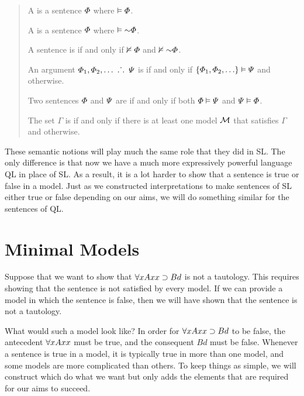 \begin{quote}
A  is a sentence $\varPhi$ where $\vDash\varPhi$.

A  is a sentence $\varPhi$ where $\models\enot\metaA$.

A sentence is  if and only if $\nvDash\varPhi$ and $\nmodels\enot\metaA$.

  An argument $\metaA_1,\metaA_2,\ldots\ \therefore\ \metaB$ is  if and only if $\lbrace\varPhi_1,\varPhi_2,\ldots\rbrace\vDash\varPsi$ and  otherwise.

Two sentences $\varPhi$ and $\varPsi$ are  if and only if both $\varPhi\vDash\varPsi$ and $\varPsi\vDash\varPhi$.

The set $\Gamma$ is  if and only if there is at least one model $\mathcal{M}$ that satisfies $\Gamma$ and  otherwise.
\end{quote}

These semantic notions will play much the same role that they did in SL.
The only difference is that now we have a much more expressively powerful language QL in place of SL.
As a result, it is a lot harder to show that a sentence is true or false in a model.
Just as we constructed interpretations to make sentences of SL either true or false depending on our aims, we will do something similar for the sentences of QL.





\section{Minimal Models}

Suppose that we want to show that $\forall xAxx \supset Bd$ is not a tautology.
This requires showing that the sentence is not satisfied by every model.
If we can provide a model in which the sentence is false, then we will have shown that the sentence is not a tautology.

What would such a model look like?
In order for $\forall xAxx \supset Bd$ to be false, the antecedent $\forall x Axx$ must be true, and the consequent $Bd$ must be false.
Whenever a sentence is true in a model, it is typically true in more than one model, and some models are more complicated than others.
To keep things as simple, we will construct  which do what we want but only adds the elements that are required for our aims to succeed.

